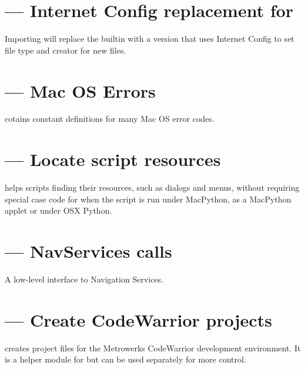 \section{ --- Internet Config replacement for }

Importing  will replace the builtin 
with a version that uses Internet Config to set file type and creator
for new files.


\section{ --- Mac OS Errors}

 cotains constant definitions for many Mac OS error
codes.


\section{ --- Locate script resources}

 helps scripts finding their resources, such as
dialogs and menus, without requiring special case code for when the
script is run under MacPython, as a MacPython applet or under OSX Python.

\section{ --- NavServices calls}

A low-level interface to Navigation Services. 

\section{ --- Create CodeWarrior projects}

 creates project files for the Metrowerks CodeWarrior
development environment. It is a helper module for
 but can be used separately for more
control.



